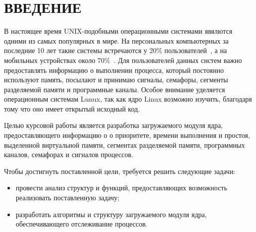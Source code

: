 \chapter*{ВВЕДЕНИЕ}

В настоящее время UNIX-подобными операционными системами явялются одними из самых популярных в мире. На персональных компьютерных за последние 10 лет такие системы  встречаются у 20\% пользователей~\cite{statistics:using-desktop}, а на мобильных устройствах около 70\%~\cite{statistics:using-mobile}. Для пользователей данных систем важно предоставлять информацию о выполнении процесса, который постоянно используют память, посылают и принимаю сигналы, семафоры, сегменты разделяемой памяти и программные каналы. Особое внимание уделяется операционным системам Lunux, так как ядро Linux возможно изучить, благодаря тому что оно имеет открытый исходный код.


Целью курсовой работы является разработка загружаемого модуля ядра, предоставляющего информацию о о приоритете, времени выполнения и простоя, выделенной виртуальной памяти, сегментах разделяемой памяти, программных каналов, семафорах и сигналов процессов.

Чтобы достигнуть поставленной цели, требуется решить следующие задачи:
\begin{itemize}
	\item провести анализ структур и функций, предоставляющих возможность реализовать поставленную задачу;
	\item разработать алгоритмы и структуру загружаемого модуля ядра, обеспечивающего отслеживание процессов.  
\end{itemize}
